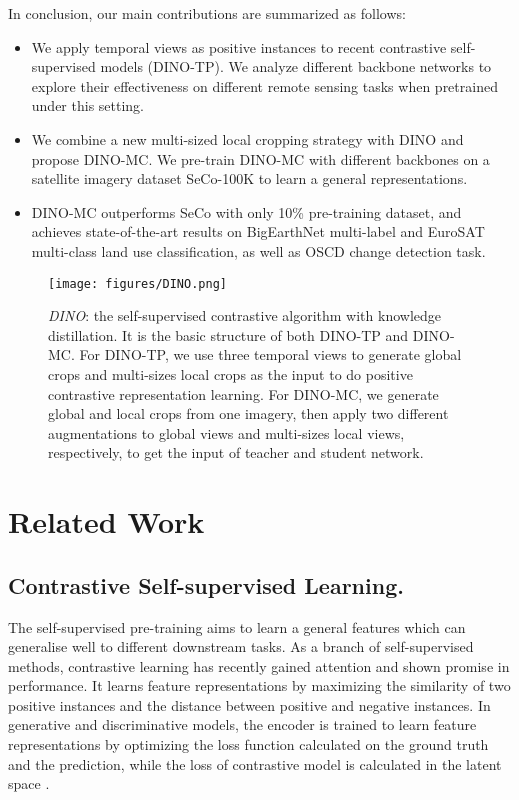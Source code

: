 \documentclass[10pt,twocolumn,letterpaper]{article}
\begin{document}
In conclusion, our main contributions are summarized as follows:
\begin{itemize}
\item[] We apply temporal views as positive instances to recent contrastive self-supervised models (DINO-TP). We analyze different backbone networks to explore their effectiveness on different remote sensing tasks when pretrained under this setting.
\item[] We combine a new multi-sized local cropping strategy with DINO and propose DINO-MC. We pre-train DINO-MC with different backbones on a satellite imagery dataset SeCo-100K to learn a general representations.
\item[] DINO-MC outperforms SeCo with only 10\% pre-training dataset, and achieves state-of-the-art results on BigEarthNet multi-label and EuroSAT multi-class land use classification, as well as OSCD change detection task.
\end{itemize}

\begin{figure*}
  \centering
  \texttt{[image: figures/DINO.png]}
  \caption{
  \textit{DINO}: the self-supervised contrastive algorithm with knowledge distillation.
  It is the basic structure of both DINO-TP and DINO-MC.
  For DINO-TP, we use three temporal views to generate global crops and multi-sizes local crops as the input to do positive contrastive representation learning.
  For DINO-MC, we generate global and local crops from one imagery, then apply two different augmentations to global views and multi-sizes local views, respectively, to get the input of teacher and student network.
  }
  \label{fig:dino}
\end{figure*}

\section{Related Work}
\subsection{Contrastive Self-supervised Learning.}
The self-supervised pre-training aims to learn a general features which can generalise well to different downstream tasks.
As a branch of self-supervised methods, contrastive learning has recently gained attention and shown promise in performance. It learns feature representations by maximizing the similarity of two positive instances and the distance between positive and negative instances.
In generative and discriminative models, the encoder is trained to learn feature representations by optimizing the loss function calculated on the ground truth and the prediction, while the loss of contrastive model is calculated in the latent space \cite{wang2022selfreview}.
\end{document}
